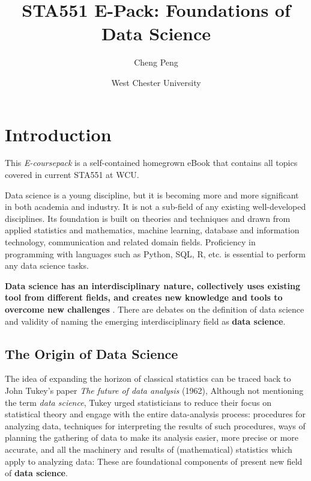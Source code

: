 \documentclass[
]{book}
\title{STA551 E-Pack: Foundations of Data Science}
\author{Cheng Peng}
\date{West Chester University}
\begin{document}
\maketitle

{
\setcounter{tocdepth}{1}
\tableofcontents
}
\hypertarget{introduction}{%
\chapter{Introduction}\label{introduction}}

This \emph{E-coursepack} is a self-contained homegrown eBook that contains all topics covered in current STA551 at WCU.

Data science is a young discipline, but it is becoming more and more significant in both academia and industry. It is not a sub-field of any existing well-developed disciplines. Its foundation is built on theories and techniques and drawn from applied statistics and mathematics, machine learning, database and information technology, communication and related domain fields. Proficiency in programming with languages such as Python, SQL, R, etc. is essential to perform any data science tasks.

\textbf{Data science has an interdisciplinary nature, collectively uses existing tool from different fields, and creates new knowledge and tools to overcome new challenges }. There are debates on the definition of data science and validity of naming the emerging interdisciplinary field as \textbf{data science}.

\hypertarget{the-origin-of-data-science}{%
\section{The Origin of Data Science}\label{the-origin-of-data-science}}

The idea of expanding the horizon of classical statistics can be traced back to John Tukey's paper \emph{The future of data analysis} (1962), Although not mentioning the term \emph{data science}, Tukey urged statisticians to reduce their focus on statistical theory and engage with the entire data-analysis process: procedures for analyzing data, techniques for interpreting the results of such procedures, ways of planning the gathering of data to make its analysis easier, more precise or more accurate, and all the machinery and results of (mathematical) statistics which apply to analyzing data: These are foundational components of present new field of \textbf{data science}.
\end{document}
